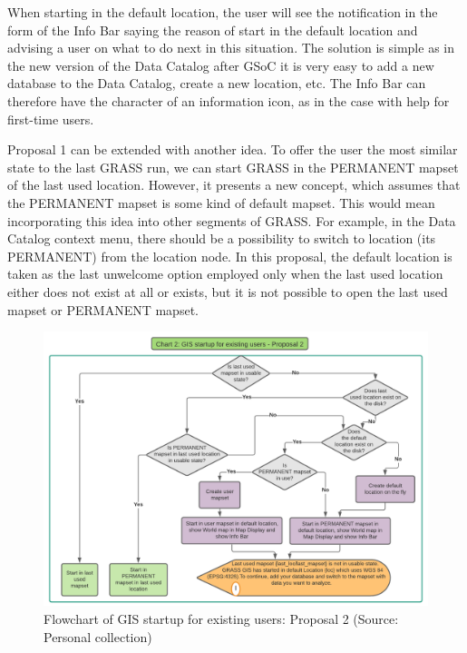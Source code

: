 \documentclass[a4paper,10pt,twoside]{article}
\begin{document}
\newpage
When starting in the default location, the user will see the notification in the form of the Info Bar saying the reason of start in the default location and advising a user on what to do next in this situation. The solution is simple as in the new version of the Data Catalog after GSoC it is very easy to add a new database to the Data Catalog, create a new location, etc. The Info Bar can therefore have the character of an information icon, as in the case with help for first-time users.

Proposal 1 can be extended with another idea. To offer the user the most similar state to the last GRASS run, we can start GRASS in the PERMANENT mapset of the last used location. However, it presents a new concept, which assumes that the PERMANENT mapset is some kind of default mapset. This would mean incorporating this idea into other segments of GRASS. For example, in the Data Catalog context menu, there should be a possibility to switch to location (its PERMANENT) from the location node. In this proposal, the default location is taken as the last unwelcome option employed only when the last used location either does not exist at all or exists, but it is not possible to open the last used mapset or PERMANENT mapset.
 
\vspace{0.3cm}
\begin{figure}[hbt!] 
\begin{center}
\includegraphics[width=17cm]{../pictures/normal_user_diagram2.png} 
\caption[Flowchart of GIS startup for existing users: Proposal 2]{Flowchart of GIS startup for existing users: Proposal 2 (Source: Personal collection)}
\label{fig:normal_user_diagram2}
\end{center}
\end{figure}
\end{document}
